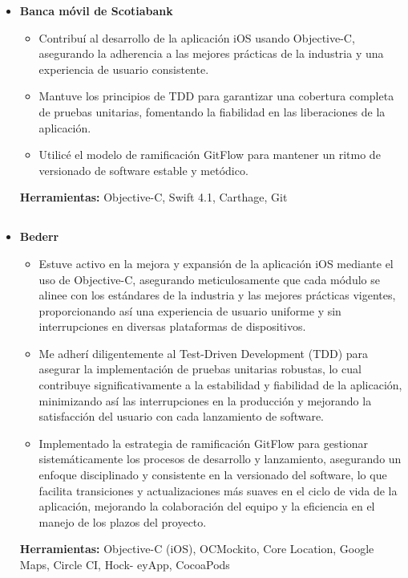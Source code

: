\documentclass[11pt,a4paper,english]{moderncv}
\begin{document}
{\begin{itemize}
\begin{itemize}
            \item Desarrollé un sistema automatizado de moderación de contenido utilizando AWS Rekognition y Azure Cognitive Services que mantuvo la calidad y el cumplimiento del contenido.
        \end{itemize}
        \textbf{Herramientas:} Python, asyncio, Flask, SQLAlchemy, MySQL, MongoDB, Mock, Git, Docker
    \item \textbf{Banca móvil de Scotiabank}
        \begin{itemize}
            \item Contribuí al desarrollo de la aplicación iOS usando Objective-C, asegurando la adherencia a las mejores prácticas de la industria y una experiencia de usuario consistente.
            \item Mantuve los principios de TDD para garantizar una cobertura completa de pruebas unitarias, fomentando la fiabilidad en las liberaciones de la aplicación.
            \item Utilicé el modelo de ramificación GitFlow para mantener un ritmo de versionado de software estable y metódico.
        \end{itemize}
        \textbf{Herramientas:} Objective-C, Swift 4.1, Carthage, Git
\end{itemize}
}

\subsection{}

{
\begin{itemize}
    \item \textbf{Bederr}
        \begin{itemize}
            \item Estuve activo en la mejora y expansión de la aplicación iOS mediante el uso de Objective-C, asegurando meticulosamente que cada módulo se alinee con los estándares de la industria y las mejores prácticas vigentes, proporcionando así una experiencia de usuario uniforme y sin interrupciones en diversas plataformas de dispositivos.
            \item Me adherí diligentemente al Test-Driven Development (TDD) para asegurar la implementación de pruebas unitarias robustas, lo cual contribuye significativamente a la estabilidad y fiabilidad de la aplicación, minimizando así las interrupciones en la producción y mejorando la satisfacción del usuario con cada lanzamiento de software.
            \item Implementado la estrategia de ramificación GitFlow para gestionar sistemáticamente los procesos de desarrollo y lanzamiento, asegurando un enfoque disciplinado y consistente en la versionado del software, lo que facilita transiciones y actualizaciones más suaves en el ciclo de vida de la aplicación, mejorando la colaboración del equipo y la eficiencia en el manejo de los plazos del proyecto.
        \end{itemize}
        \textbf{Herramientas:} Objective-C (iOS), OCMockito, Core Location, Google Maps, Circle CI, Hock- eyApp, CocoaPods
\end{itemize}
}
\end{document}
